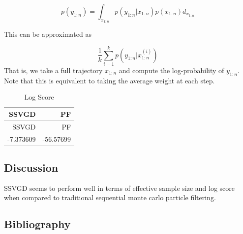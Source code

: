 \documentclass[]{article}
\newenvironment{Shaded}{\begin{snugshade}}{\end{snugshade}}
\newcommand{\KeywordTok}[1]{\textcolor[rgb]{0.13,0.29,0.53}{\textbf{{#1}}}}
\newcommand{\DataTypeTok}[1]{\textcolor[rgb]{0.13,0.29,0.53}{{#1}}}
\newcommand{\DecValTok}[1]{\textcolor[rgb]{0.00,0.00,0.81}{{#1}}}
\newcommand{\StringTok}[1]{\textcolor[rgb]{0.31,0.60,0.02}{{#1}}}
\newcommand{\NormalTok}[1]{{#1}}
\begin{document}
\[p(y_{1:n}) = \int_{x_{1:n}} p(y_{1:n} | x_{1:n}) p(x_{1:n}) d_{x_{1:n}}\]

This can be approximated as

\[\frac{1}{k}\sum_{i=1}^k p(y_{1:n} | x^{(i)}_{1:n})\] That is, we take
a full trajectory \(x_{1:n}\) and compute the log-probability of
\(y_{1:n}\). Note that this is equivalent to taking the average weight
at each step.

\begin{Shaded}
\end{Shaded}

\begin{longtable}[]{@{}rr@{}}
\caption{Log Score}\tabularnewline
\toprule
SSVGD & PF\tabularnewline
\midrule
\endfirsthead
\toprule
SSVGD & PF\tabularnewline
\midrule
\endhead
-7.373609 & -56.57699\tabularnewline
\bottomrule
\end{longtable}

\subsection{Discussion}\label{discussion}

SSVGD seems to perform well in terms of effective sample size and log
score when compared to traditional sequential monte carlo particle
filtering.

\subsection{Bibliography}\label{bibliography}
\end{document}
